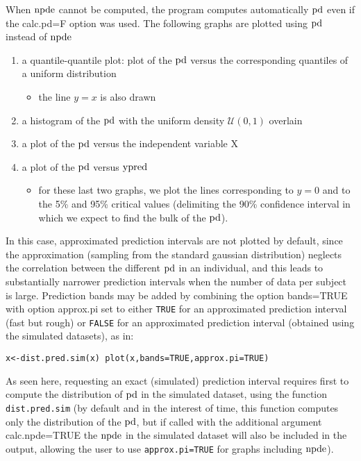When ${\rm npde}$ cannot be computed, the program computes automatically ${\rm pd}$ even if the {\sf calc.pd=F} option was 
used. The following graphs are plotted using ${\rm pd}$ instead of ${\rm npde}$ \begin{enumerate} \item a quantile-quantile 
plot: plot of the ${\rm pd}$ versus the corresponding quantiles of a uniform distribution \begin{itemize} \item the line 
$y=x$ is also drawn \end{itemize} \item a histogram of the ${\rm pd}$ with the uniform density $\mathcal{U}(0,1)$ 
overlain \item a plot of the ${\rm pd}$ versus the independent variable X \item a plot of the ${\rm pd}$ versus ${\rm ypred}$ 
\begin{itemize} \item for these last two graphs, we plot the lines corresponding to $y=0$ and to the 5\% and 95\% 
critical values (delimiting the 90\% confidence interval in which we expect to find the bulk of the ${\rm pd}$). 
\end{itemize} \end{enumerate} In this case, approximated prediction intervals are not plotted by default, since the 
approximation (sampling from the standard gaussian distribution) neglects the correlation between the different 
${\rm pd}$ in an individual, and this leads to substantially narrower prediction intervals when the number of data per 
subject is large. Prediction bands may be added by combining the option {\sf bands=TRUE} with option {\sf 
approx.pi} set to either \texttt{TRUE} for an approximated prediction interval (fast but rough) or \texttt{FALSE} 
for an approximated prediction interval (obtained using the simulated datasets), as in: \begin{verbatim} 
x<-dist.pred.sim(x) plot(x,bands=TRUE,approx.pi=TRUE) \end{verbatim} As seen here, requesting an exact (simulated) 
prediction interval requires first to compute the distribution of ${\rm pd}$ in the simulated dataset, using the 
function \texttt{dist.pred.sim} (by default and in the interest of time, this function computes only the 
distribution of the ${\rm pd}$, but if called with the additional argument {\sf calc.npde=TRUE} the ${\rm npde}$ in the 
simulated dataset will also be included in the output, allowing the user to use \texttt{approx.pi=TRUE} for graphs 
including ${\rm npde}$).

